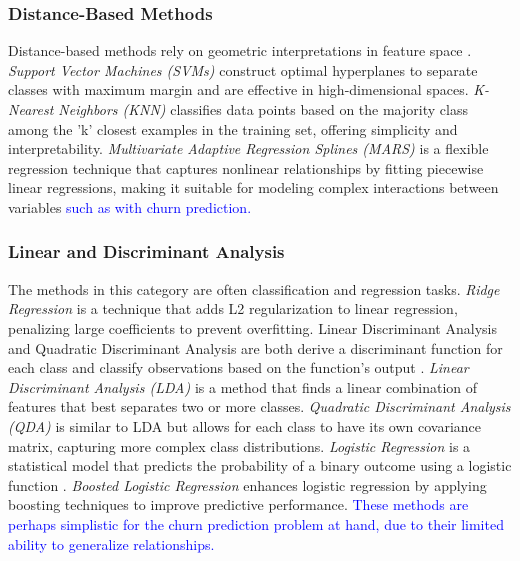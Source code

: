 \documentclass[preprint,12pt]{elsarticle}
\begin{document}
\subsubsection{Distance-Based Methods}

Distance-based methods rely on geometric interpretations in feature space \cite{hsu2002comparison}. \textit{Support Vector Machines (SVMs)} construct optimal hyperplanes to separate classes with maximum margin and are effective in high-dimensional spaces. \textit{K-Nearest Neighbors (KNN)} classifies data points based on the majority class among the 'k' closest examples in the training set, offering simplicity and interpretability. \textit{Multivariate Adaptive Regression Splines (MARS)} \cite{friedman1995introduction} is a flexible regression technique that captures nonlinear relationships by fitting piecewise linear regressions, making it suitable for modeling complex interactions between variables \textcolor{blue}{such as with churn prediction.}

\subsubsection{Linear and Discriminant Analysis}

The methods in this category are often classification and regression tasks. \textit{Ridge Regression} is a technique that adds L2 regularization to linear regression, penalizing large coefficients to prevent overfitting. Linear Discriminant Analysis and Quadratic Discriminant Analysis are both derive a discriminant function for each class and classify observations based on the function's output \cite{tharwat2016linear}. \textit{Linear Discriminant Analysis (LDA)} is a method that finds a linear combination of features that best separates two or more classes. \textit{Quadratic Discriminant Analysis (QDA)} is similar to LDA but allows for each class to have its own covariance matrix, capturing more complex class distributions. \textit{Logistic Regression} is a statistical model that predicts the probability of a binary outcome using a logistic function \cite{hosmer2013applied}. \textit{Boosted Logistic Regression} enhances logistic regression by applying boosting techniques to improve predictive performance. \textcolor{blue}{These methods are perhaps simplistic for the churn prediction problem at hand, due to their limited ability to generalize relationships.}
\end{document}
